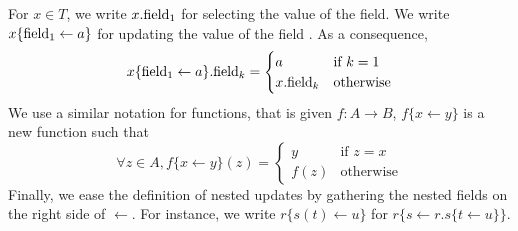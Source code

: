 For $x \in T$, we write $x.\mathrm{field_1}$ for selecting the value of the
 field. We write $x \{ \mathrm{field_1} \leftarrow a \}$ for
updating the value of the field . As a consequence,
%
\[
  x \{ \mathrm{field_1} \leftarrow a \}.\mathrm{field}_k = \begin{cases}
    a & \text{if } k = 1 \\
    x.\mathrm{field}_k & \text{otherwise}
  \end{cases}
\]
%
We use a similar notation for functions, that is given
\( f : A \rightarrow B \), \( f \{ x \leftarrow y \} \) is a new function such
that
%
\[
  \forall z \in A, f \{ x \leftarrow y \}(z) = \begin{cases}
    y & \text{if } z = x \\
    f(z) & \text{otherwise}
  \end{cases}
\]
%
Finally, we ease the definition of nested updates by gathering the nested fields
on the right side of \( \leftarrow \).
%
For instance, we write \( r \{ s(t) \leftarrow u \} \) for
\( r \{ s \leftarrow r.s \{ t \leftarrow u \} \} \).
